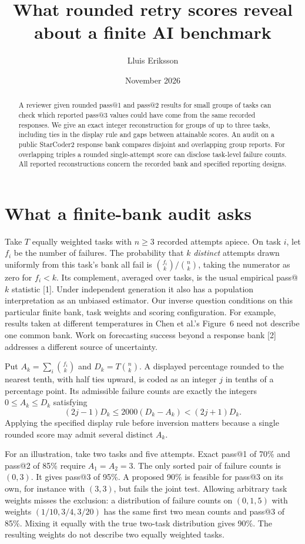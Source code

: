 \documentclass[11pt]{article}
\title{What rounded retry scores reveal about a finite AI benchmark}
\author{Lluis Eriksson}
\date{November 2026}
\begin{document}
\maketitle
\begin{abstract}
A reviewer given rounded pass@1 and pass@2 results for small groups of tasks can check which reported pass@3 values could have come from the same recorded responses. We give an exact integer reconstruction for groups of up to three tasks, including ties in the display rule and gaps between attainable scores. An audit on a public StarCoder2 response bank compares disjoint and overlapping group reports. For overlapping triples a rounded single-attempt score can disclose task-level failure counts. All reported reconstructions concern the recorded bank and specified reporting designs.
\end{abstract}

\section{What a finite-bank audit asks}
Take $T$ equally weighted tasks with $n\ge3$ recorded attempts apiece. On task $i$, let $f_i$ be the number of failures. The probability that $k$ \emph{distinct} attempts drawn uniformly from this task's bank all fail is $\binom{f_i}{k}/\binom nk$, taking the numerator as zero for $f_i<k$. Its complement, averaged over tasks, is the usual empirical pass@$k$ statistic [1]. Under independent generation it also has a population interpretation as an unbiased estimator. Our inverse question conditions on this particular finite bank, task weights and scoring configuration. For example, results taken at different temperatures in Chen et al.'s Figure~6 need not describe one common bank. Work on forecasting success beyond a response bank [2] addresses a different source of uncertainty.

Put $A_k=\sum_i\binom{f_i}{k}$ and $D_k=T\binom nk$. A displayed percentage rounded to the nearest tenth, with half ties upward, is coded as an integer $j$ in tenths of a percentage point. Its admissible failure counts are exactly the integers $0\le A_k\le D_k$ satisfying
\[
        (2j-1)D_k \le 2000(D_k-A_k)<(2j+1)D_k.
\]
Applying the specified display rule before inversion matters because a single rounded score may admit several distinct $A_k$.

For an illustration, take two tasks and five attempts. Exact pass@1 of 70\% and pass@2 of 85\% require $A_1=A_2=3$. The only sorted pair of failure counts is $(0,3)$. It gives pass@3 of 95\%. A proposed 90\% is feasible for pass@3 on its own, for instance with $(3,3)$, but fails the joint test. Allowing arbitrary task weights misses the exclusion: a distribution of failure counts on $(0,1,5)$ with weights $(1/10,3/4,3/20)$ has the same first two mean counts and pass@3 of 85\%. Mixing it equally with the true two-task distribution gives 90\%. The resulting weights do not describe two equally weighted tasks.
\end{document}
